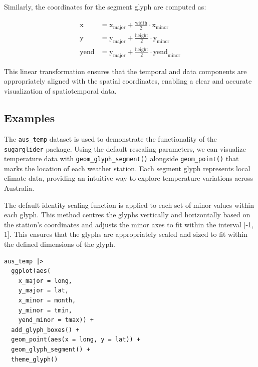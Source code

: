 Similarly, the coordinates for the segment glyph are computed as:

\begin{align}
\text{x} &= \text{x}_{\text{major}} + \frac{\text{width}}{2} \cdot \text{x}_{\text{minor}} \\
\text{y} &= \text{y}_{\text{major}} + \frac{\text{height}}{2} \cdot \text{y}_{\text{minor}} \\
\text{yend} &= \text{y}_{\text{major}} + \frac{\text{height}}{2} \cdot \text{yend}_{\text{minor}}
\end{align}

This linear transformation ensures that the temporal and data components are appropriately aligned with the spatial coordinates, enabling a clear and accurate visualization of spatiotemporal data.

\hypertarget{examples}{%
\subsection{Examples}\label{examples}}

The \texttt{aus\_temp} dataset is used to demonstrate the functionality of the \texttt{sugarglider} package. Using the default rescaling parameters, we can visualize temperature data with \texttt{geom\_glyph\_segment()} alongside \texttt{geom\_point()} that marks the location of each weather station. Each segment glyph represents local climate data, providing an intuitive way to explore temperature variations across Australia.

The default identity scaling function is applied to each set of minor values within each glyph. This method centres the glyphs vertically and horizontally based on the station's coordinates and adjusts the minor axes to fit within the interval {[}-1, 1{]}. This ensures that the glyphs are appropriately scaled and sized to fit within the defined dimensions of the glyph.

\begin{verbatim}
aus_temp |>
  ggplot(aes(
    x_major = long, 
    y_major = lat, 
    x_minor = month, 
    y_minor = tmin, 
    yend_minor = tmax)) +
  add_glyph_boxes() +
  geom_point(aes(x = long, y = lat)) +
  geom_glyph_segment() +
  theme_glyph()
\end{verbatim}

